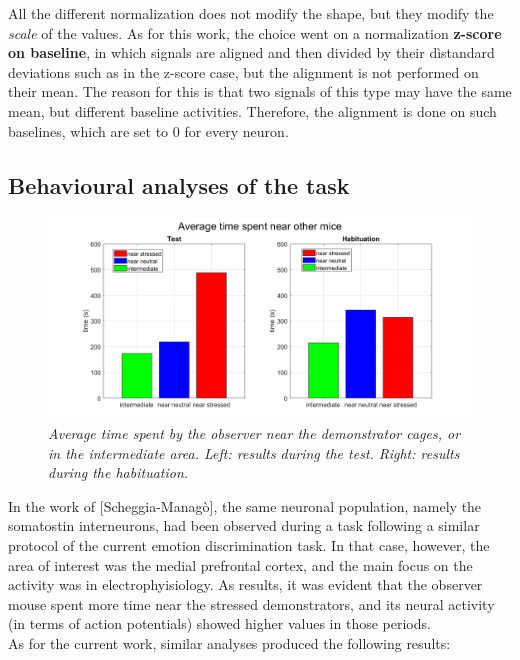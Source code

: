\documentclass[a4paper]{article}
\begin{document}
All the different normalization does not modify the shape, but they modify the \textit{scale} of the values. As for this work, the choice went on a normalization \textbf{z-score on baseline}, in which signals are aligned and then divided by their dìstandard deviations such as in the z-score case, but the alignment is not performed on their mean. The reason for this is that two signals of this type may have the same mean, but different baseline activities. Therefore, the alignment is done on such baselines, which are set to $0$ for every neuron.



\subsection{Behavioural analyses of the task}


\begin{figure}[H]
	
	\centering
	
	\hspace*{-1.4 cm}
	\includegraphics[scale=.42]{times.png} 
	\caption{\textit{Average time spent by the observer near the demonstrator cages, or in the intermediate area. Left: results during the test. Right: results during the habituation. }}
	
\end{figure}

In the work of [Scheggia-Managò], the same neuronal population, namely the somatostin interneurons, had been observed during a task following a similar protocol of the current emotion discrimination task. In that case, however, the area of interest was the medial prefrontal cortex, and the main focus on the activity was in electrophyisiology. As results, it was evident that the observer mouse spent more time near the stressed demonstrators, and its neural activity (in terms of action potentials) showed higher values in those periods.\\
As for the current work, similar analyses produced the following results:
\end{document}
